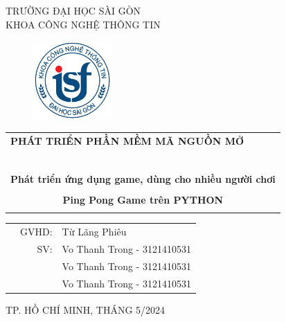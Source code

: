 \documentclass[a4paper]{article}
\begin{document}
\begin{titlepage}
\begin{center}
TRƯỜNG ĐẠI HỌC SÀI GÒN \\
KHOA CÔNG NGHỆ THÔNG TIN
\end{center}
\vspace{1cm}


\begin{figure}[h!]
\begin{center}
\includegraphics[width=3cm]{image/logoITSGU.png}
\end{center}
\end{figure}

\vspace{1cm}


\begin{center}
\begin{tabular}{c}
	\multicolumn{1}{l}{\textbf{{\Large PHÁT TRIỂN PHẦN MỀM MÃ NGUỒN MỞ}}}\\
	~~\\
	\hline
	\\
	\multicolumn{1}{l}{\textbf{{\Large Phát triển ứng dụng game, dùng cho nhiều người chơi}}}\\
	\\
	
	\textbf{{\Huge Ping Pong Game trên PYTHON}}\\
	\\
	\hline
\end{tabular}
\end{center}

\vspace{3cm}

\begin{table}[h]
\begin{tabular}{rrl}
\hspace{5 cm} & GVHD: &Từ Lãng Phiêu\\
& SV: & Vo Thanh Trong - 3121410531\\
& & Vo Thanh Trong - 3121410531 \\
& & Vo Thanh Trong - 3121410531 \\
\end{tabular}
\vspace{1.5 cm}
\end{table}

\begin{center}

{\footnotesize TP. HỒ CHÍ MINH, THÁNG 5/2024}
\end{center}
\end{titlepage}
\end{document}
